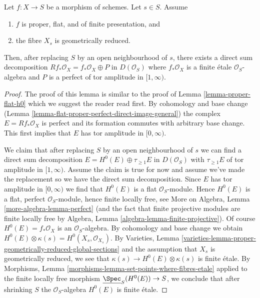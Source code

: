 \begin{lemma}
\label{lemma-proper-flat-geom-red}
Let $f : X \to S$ be a morphism of schemes. Let $s \in S$. Assume
\begin{enumerate}
\item $f$ is proper, flat, and of finite presentation, and
\item the fibre $X_s$ is geometrically reduced.
\end{enumerate}
Then, after replacing $S$ by an open neighbourhood of $s$, there
exists a direct sum decomposition
$Rf_*\mathcal{O}_X = f_*\mathcal{O}_X \oplus P$
in $D(\mathcal{O}_S)$ where $f_*\mathcal{O}_X$ is a finite \'etale
$\mathcal{O}_S$-algebra and
$P$ is a perfect of tor amplitude in $[1, \infty)$.
\end{lemma}

\begin{proof}
The proof of this lemma is similar to the proof of
Lemma \ref{lemma-proper-flat-h0}
which we suggest the reader read first.
By cohomology and base change
(Lemma \ref{lemma-flat-proper-perfect-direct-image-general})
the complex $E = Rf_*\mathcal{O}_X$
is perfect and its formation commutes with arbitrary base change.
This first implies that $E$ has tor amplitude in $[0, \infty)$.

\medskip\noindent
We claim that after replacing $S$ by an open neighbourhood of
$s$ we can find a direct sum decomposition
$E = H^0(E) \oplus \tau_{\geq 1}E$ in $D(\mathcal{O}_S)$
with $\tau_{\geq 1}E$ of tor amplitude in $[1, \infty)$.
Assume the claim is true for now and assume we've made the replacement
so we have the direct sum decomposition.
Since $E$ has tor amplitude in $[0, \infty)$ we find that
$H^0(E)$ is a flat $\mathcal{O}_S$-module.
Hence $H^0(E)$ is a flat, perfect $\mathcal{O}_S$-module,
hence finite locally free, see
More on Algebra, Lemma \ref{more-algebra-lemma-perfect}
(and the fact that finite projective modules are finite locally free by
Algebra, Lemma \ref{algebra-lemma-finite-projective}).
Of course $H^0(E) = f_*\mathcal{O}_X$ is an $\mathcal{O}_S$-algebra.
By cohomology and base change we obtain
$H^0(E) \otimes \kappa(s) = H^0(X_s, \mathcal{O}_{X_s})$.
By Varieties, Lemma
\ref{varieties-lemma-proper-geometrically-reduced-global-sections}
and the assumption that $X_s$ is geometrically reduced, we
see that $\kappa(s) \to H^0(E) \otimes \kappa(s)$
is finite \'etale. By Morphisms, Lemma
\ref{morphisms-lemma-set-points-where-fibres-etale}
applied to the finite locally free morphism
$\underline{\Spec}_S(H^0(E)) \to S$,
we conclude that after shrinking $S$ the $\mathcal{O}_S$-algebra
$H^0(E)$ is finite \'etale.


\end{proof}
